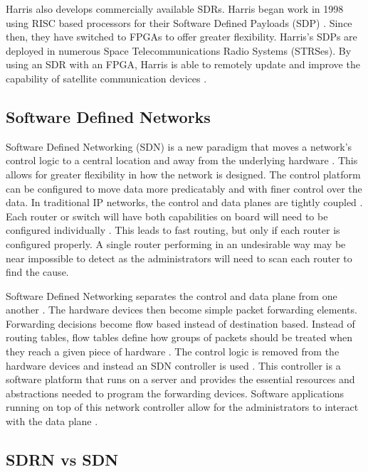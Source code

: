 Harris also develops commercially available SDRs. Harris began work in 1998 using RISC based processors for their Software Defined Payloads (SDP) \cite{5747366}. Since then, they have switched to FPGAs to offer greater flexibility. Harris's SDPs are deployed in numerous Space Telecommunications Radio Systems (STRSes). By using an SDR with an FPGA, Harris is able to remotely update and improve the capability of satellite communication devices \cite{5747366}. 

\subsection{Software Defined Networks}

Software Defined Networking (SDN) is a new paradigm that moves a network's control logic to a central location and away from the underlying hardware \cite{6994333}. This allows for greater flexibility in how the network is designed. The control platform can be configured to move data more predicatably and with finer control over the data. In traditional IP networks, the control and data planes are tightly coupled \cite{6994333}. Each router or switch will have both capabilities on board will need to be configured individually \cite{7179430}. This leads to fast routing, but only if each router is configured properly. A single router performing in an undesirable way may be near impossible to detect as the administrators will need to scan each router to find the cause. 

Software Defined Networking separates the control and data plane from one another \cite{6994333}. The hardware devices then become simple packet forwarding elements. Forwarding decisions become flow based instead of destination based. Instead of routing tables, flow tables define how groups of packets should be treated when they reach a given piece of hardware \cite{7179430}. The control logic is removed from the hardware devices and instead an SDN controller is used \cite{6994333}. This controller is a software platform that runs on a server and provides the essential resources and abstractions needed to program the forwarding devices. Software applications running on top of this network controller allow for the administrators to interact with the data plane \cite{7452335}. 

\subsection{SDRN vs SDN}

